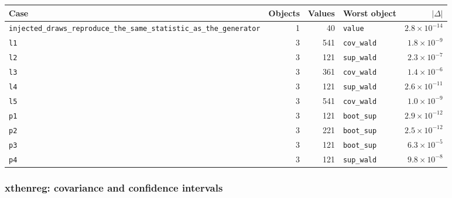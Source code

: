 \documentclass[
  10.5pt,
  a4paper,
]{article}
\begin{document}
\begin{longtable}{@{}p{3.6cm}rrp{4.9cm}r@{}}
\toprule
Case & Objects & Values & Worst object & $|\Delta|$ \\
\midrule
\endhead
\texttt{injected\_\allowbreak{}draws\_\allowbreak{}reproduce\_\allowbreak{}the\_\allowbreak{}same\_\allowbreak{}statistic\_\allowbreak{}as\_\allowbreak{}the\_\allowbreak{}generator} & 1 & 40 & \texttt{value} & $2.8\times10^{-14}$ \\
\texttt{l1} & 3 & 541 & \texttt{cov\_\allowbreak{}wald} & $1.8\times10^{-9}$ \\
\texttt{l2} & 3 & 121 & \texttt{sup\_\allowbreak{}wald} & $2.3\times10^{-7}$ \\
\texttt{l3} & 3 & 361 & \texttt{cov\_\allowbreak{}wald} & $1.4\times10^{-6}$ \\
\texttt{l4} & 3 & 121 & \texttt{sup\_\allowbreak{}wald} & $2.6\times10^{-11}$ \\
\texttt{l5} & 3 & 541 & \texttt{cov\_\allowbreak{}wald} & $1.0\times10^{-9}$ \\
\texttt{p1} & 3 & 121 & \texttt{boot\_\allowbreak{}sup} & $2.9\times10^{-12}$ \\
\texttt{p2} & 3 & 221 & \texttt{boot\_\allowbreak{}sup} & $2.5\times10^{-12}$ \\
\texttt{p3} & 3 & 121 & \texttt{boot\_\allowbreak{}sup} & $6.3\times10^{-5}$ \\
\texttt{p4} & 3 & 121 & \texttt{sup\_\allowbreak{}wald} & $9.8\times10^{-8}$ \\
\bottomrule
\end{longtable}

\subsubsection*{xthenreg: covariance and confidence intervals}
\end{document}
